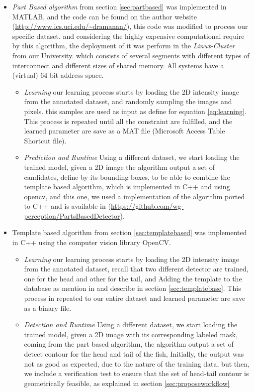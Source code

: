 \begin{itemize}
\item \textit{Part Based algorithm } from section \ref{sec:partbased} was implemented in 
MATLAB, and the code can be found on the author website (\url{http://www.ics.uci.edu/~dramanan/}), 
this code was modified to process our specific dataset. and considering the highly expensive 
computational require by this algorithm, the deployment
of it was perform in the \textit{Linux-Cluster} from our University. which consists of several
 segments with different types of interconnect and different sizes of shared memory. 
 All systems have a (virtual) 64 bit address space.
	\begin{itemize}	
	\item \textit{Learning} our learning process starts by loading the 2D intensity 
	image from the annotated dataset, and randomly sampling the images and pixels. 
	this samples are used as input as define for equation \ref{eq:learning}. This
	process is repeated until all the constraint are fulfilled, and the learned parameter 
	are save as a MAT file (Microsoft Access Table Shortcut file).
	\item \textit{Prediction and Runtime} Using a different dataset, we start loading
	the trained model, given a 2D image the algorithm output a set of candidates, 
	define by its bounding boxes, to be able to combine the template based algorithm, 
	which is implemented in C++ and using opencv, and this one, we used a implementation
	of the algorithm ported to C++ and is available in 
	(\url{https://github.com/wg-perception/PartsBasedDetector}).
	\end{itemize}
\item{Template based algorithm } from section \ref{sec:templatebased} was implemented in C++ 
using the computer vision library OpenCV.
	\begin{itemize}
	\item \textit{Learning} our learning process starts by loading the  2D intensity 
	image from the annotated dataset, recall that two different detector are trained, 
	one for the head and other for the tail, and Adding the template to the database as 
	mention in \citet{Hinterstoisser2012} and describe in section \ref{sec:templatebase}. 
	This process in repeated to our entire dataset and learned parameter are save as a
	binary file.
	\item \textit{Detection and Runtime} Using a different dataset, we start loading
	the trained model, given a 2D image with its corresponding labeled mask, coming from
	the part based algorithm, the algorithm output a set of detect contour for the head
	and tail of the fish, Initially, the output was not as good as expected, due to
	the nature of the training data, but then, we include a verification test to ensure 
	that the set of head-tail contour is geometrically feasible, as explained in section
	\ref{sec:proposeworkflow}
	\end{itemize}
\end{itemize}
